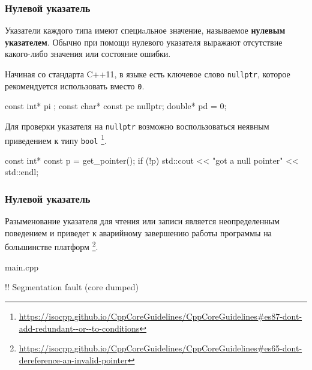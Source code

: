 \documentclass[compress, 8pt]{beamer}
\begin{document}
\begin{frame}[fragile]

    \frametitle{Нулевой указатель}

    \hfill \break

    Указатели каждого типа имеют специaльное значение, называемое
    \textbf{нулевым указателем}.
    Обычно при помощи нулевого указателя выражают отсутствие какого-либо
    значения или состояние ошибки.

    Начиная со стандарта C++11, в языке есть ключевое слово \verb|nullptr|,
    которое рекомендуется\footnotemark{} использовать вместо \verb|0|.


    \begin{myinplacelisting}[minted language=cpp]
const int* pi {};
const char* const pc { nullptr; }
double* pd = 0;
    \end{myinplacelisting}

    Для проверки указателя на \verb|nullptr| возможно воспользоваться
    неявным приведением к типу \verb|bool|
    \footnote{\url{https://isocpp.github.io/CppCoreGuidelines/CppCoreGuidelines\#es87-dont-add-redundant--or--to-conditions}}.

    \begin{myinplacelisting}[minted language=cpp]
const int* const p = get_pointer();
if (!p) {
    std::cout << "got a null pointer" << std::endl;
}
    \end{myinplacelisting}

\end{frame}

\begin{frame}[fragile]

    \frametitle{Нулевой указатель}

    Разыменование указателя для чтения или записи является неопределенным
    поведением и приведет к аварийному завершению работы программы на
    большинстве платформ
    \footnote{\url{https://isocpp.github.io/CppCoreGuidelines/CppCoreGuidelines\#es65-dont-dereference-an-invalid-pointer}}.

        {main.cpp}

    \begin{terminalwindow}
!!
Segmentation fault (core dumped)
    \end{terminalwindow}

\end{frame}
\end{document}
